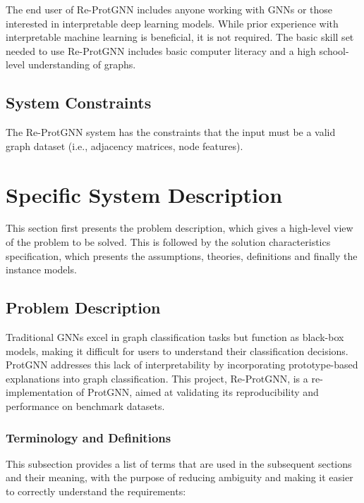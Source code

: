 \documentclass[12pt]{article}
\begin{document}
The end user of Re-ProtGNN includes anyone working with GNNs or those interested in interpretable deep learning models. While prior experience with interpretable machine learning is beneficial, it is not required. The basic skill set needed to use Re-ProtGNN includes basic computer literacy and a high school-level understanding of graphs.




\subsection{System Constraints}

The Re-ProtGNN system has the constraints that the input must be a valid graph dataset (i.e., adjacency matrices, node features).

\section{Specific System Description}

This section first presents the problem description, which gives a high-level
view of the problem to be solved.  This is followed by the solution characteristics
specification, which presents the assumptions, theories, definitions and finally
the instance models.

\subsection{Problem Description} \label{Sec_pd}
Traditional GNNs excel in graph classification tasks but function as black-box models, making it difficult for users to understand their classification decisions. ProtGNN addresses this lack of interpretability by incorporating prototype-based explanations into graph classification. This project, Re-ProtGNN, is a re-implementation of ProtGNN, aimed at validating its reproducibility and performance on benchmark datasets.


\subsubsection{Terminology and  Definitions}

This subsection provides a list of terms that are used in the subsequent
sections and their meaning, with the purpose of reducing ambiguity and making it
easier to correctly understand the requirements:
\end{document}
